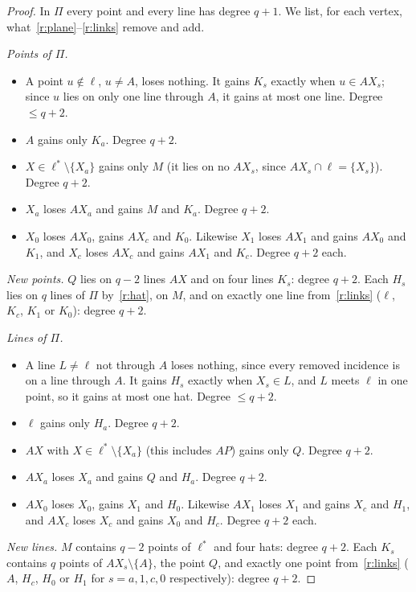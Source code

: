 \documentclass[11pt]{amsart}
\theoremstyle{remark}
\begin{document}
\begin{proof}
In $\Pi$ every point and every line has degree $q+1$. We list, for each vertex, what~\ref{r:plane}--\ref{r:links} remove and add.

\emph{Points of $\Pi$.}
\begin{itemize}[leftmargin=2em]
\item A point $u \notin \ell$, $u \neq A$, loses nothing. It gains $K_s$ exactly when $u \in AX_s$; since $u$ lies on only one line through $A$, it gains at most one line. Degree $\le q+2$.
\item $A$ gains only $K_a$. Degree $q+2$.
\item $X \in \ell^* \setminus \{X_a\}$ gains only $M$ (it lies on no $AX_s$, since $AX_s \cap \ell = \{X_s\}$). Degree $q+2$.
\item $X_a$ loses $AX_a$ and gains $M$ and $K_a$. Degree $q+2$.
\item $X_0$ loses $AX_0$, gains $AX_c$ and $K_0$. Likewise $X_1$ loses $AX_1$ and gains $AX_0$ and $K_1$, and $X_c$ loses $AX_c$ and gains $AX_1$ and $K_c$. Degree $q+2$ each.
\end{itemize}
\emph{New points.} $Q$ lies on $q-2$ lines $AX$ and on four lines $K_s$: degree $q+2$. Each $H_s$ lies on $q$ lines of $\Pi$ by~\ref{r:hat}, on $M$, and on exactly one line from~\ref{r:links} ($\ell$, $K_c$, $K_1$ or $K_0$): degree $q+2$.

\emph{Lines of $\Pi$.}
\begin{itemize}[leftmargin=2em]
\item A line $L \neq \ell$ not through $A$ loses nothing, since every removed incidence is on a line through $A$. It gains $H_s$ exactly when $X_s \in L$, and $L$ meets $\ell$ in one point, so it gains at most one hat. Degree $\le q+2$.
\item $\ell$ gains only $H_a$. Degree $q+2$.
\item $AX$ with $X \in \ell^* \setminus \{X_a\}$ (this includes $AP$) gains only $Q$. Degree $q+2$.
\item $AX_a$ loses $X_a$ and gains $Q$ and $H_a$. Degree $q+2$.
\item $AX_0$ loses $X_0$, gains $X_1$ and $H_0$. Likewise $AX_1$ loses $X_1$ and gains $X_c$ and $H_1$, and $AX_c$ loses $X_c$ and gains $X_0$ and $H_c$. Degree $q+2$ each.
\end{itemize}
\emph{New lines.} $M$ contains $q-2$ points of $\ell^*$ and four hats: degree $q+2$. Each $K_s$ contains $q$ points of $AX_s \setminus \{A\}$, the point $Q$, and exactly one point from~\ref{r:links} ($A$, $H_c$, $H_0$ or $H_1$ for $s = a, 1, c, 0$ respectively): degree $q+2$.
\end{proof}
\end{document}
